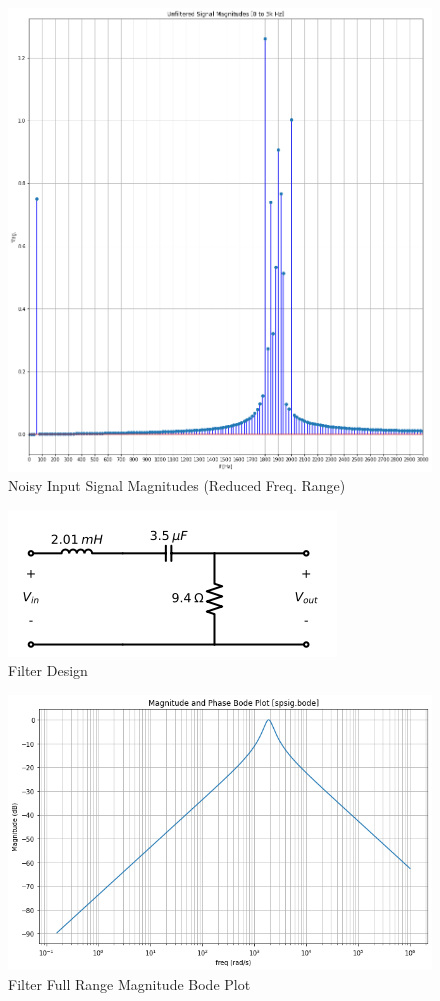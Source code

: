 \documentclass[12pt]{report}
\begin{document}
\begin{figure}[h!]
  \centering
  \includegraphics[width=\linewidth]{UISM.png}
  \caption{Noisy Input Signal Magnitudes (Reduced Freq. Range)}
  \label{fig: UISM}
\end{figure}
\begin{figure}[h!]
  \centering
  \includegraphics[scale=1]{Filter.png}
  \caption{Filter Design}
  \label{fig: Filter}
\end{figure}
\begin{figure}[h!]
  \centering
  \includegraphics[width=\linewidth]{FRFB.png}
  \caption{Filter Full Range Magnitude Bode Plot}
  \label{fig: FRFB}
\end{figure}
\end{document}
